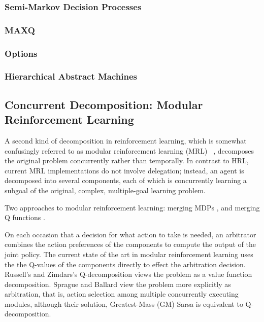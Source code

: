 \subsubsection{Semi-Markov Decision Processes}

\subsubsection{MAXQ}

\subsubsection{Options}

\subsubsection{Hierarchical Abstract Machines}


\subsection{Concurrent Decomposition: Modular Reinforcement Learning}

A second kind of decomposition in reinforcement learning, which is somewhat confusingly referred to as modular reinforcement learning (MRL) ~\cite{russell2003q-decomposition,sprague2003multiple-goal}, decomposes the original problem concurrently rather than temporally. In contrast to HRL, current MRL implementations do not involve delegation; instead, an agent is decomposed into several components, each of which is concurrently learning a subgoal of the original, complex, multiple-goal learning problem.

Two approaches to modular reinforcement learning: merging MDPs \cite{singh1998how-to-dynamically}, and merging Q functions \cite{sprague2003multiple-goal,russell2003q-decomposition}.

On each occasion that a decision for what action to take is needed, an arbitrator combines the action preferences of the components to compute the output of the joint policy.  The current state of the art in modular reinforcement learning uses the the Q-values of the components directly to effect the arbitration decision.  Russell's and Zimdars's Q-decomposition \cite{russell2003q-decomposition} views the problem as a value function decomposition.  Sprague and Ballard view the problem more explicitly as arbitration, that is, action selection among multiple concurrently executing modules, although their solution, Greatest-Mass (GM) Sarsa \cite{sprague2003multiple-goal} is equivalent to Q-decomposition.
